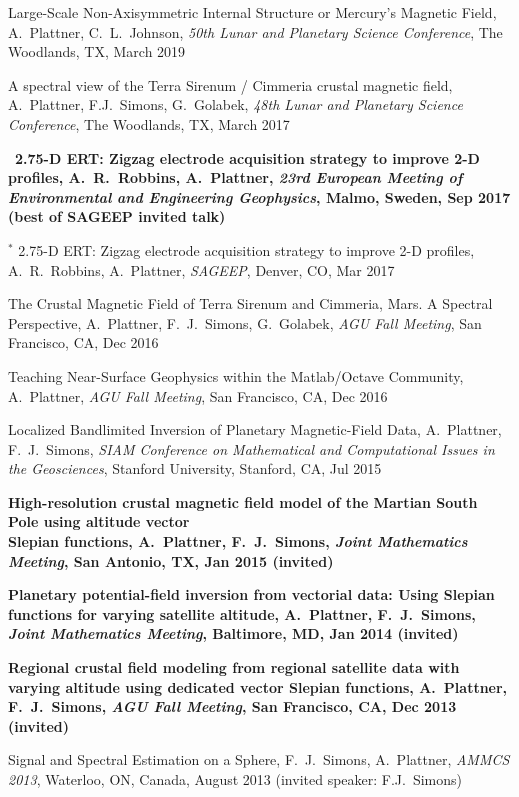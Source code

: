 \documentclass[10pt]{article}
\begin{document}
\spcp
Large-Scale Non-Axisymmetric Internal Structure or Mercury's Magnetic Field,
A.~Plattner, C.~L.~Johnson, \emph{50th Lunar and Planetary Science Conference},
The Woodlands, TX, March 2019

\spcp
A spectral view of the Terra Sirenum / Cimmeria crustal magnetic field, A.~Plattner, F.J.~Simons, G.~Golabek, \emph{48th Lunar and Planetary Science Conference}, The Woodlands, TX, March 2017

\spcp 
\hspace{-0.4cm}\ug \, \textbf{2.75-D ERT: Zigzag electrode acquisition strategy
to improve 2-D profiles,
A.~R.~Robbins, A.~Plattner,
\emph{23rd European Meeting of Environmental and Engineering Geophysics}, Malmo, Sweden, Sep 2017 (best of SAGEEP invited talk)}

\spcp 
\hspace{-0.4cm} $^*$ 2.75-D ERT: Zigzag electrode acquisition strategy
to improve 2-D profiles,
A.~R.~Robbins, A.~Plattner,
\emph{SAGEEP}, Denver, CO, Mar 2017

\spcp
The Crustal Magnetic Field of Terra Sirenum and Cimmeria, Mars. A Spectral Perspective,
A.~Plattner, F.~J.~Simons, G.~Golabek, 
\emph{AGU Fall Meeting}, San Francisco, CA, Dec 2016

\spcp
Teaching Near-Surface Geophysics within the Matlab/Octave Community,
A.~Plattner, 
\emph{AGU Fall Meeting}, San Francisco, CA, Dec 2016

\spcp
Localized Bandlimited Inversion of Planetary Magnetic-Field Data,
A.~Plattner, F.~J.~Simons,
\emph{SIAM Conference on Mathematical and Computational Issues in the Geosciences},
Stanford University, Stanford, CA, Jul 2015


\spcp
\textbf{High-resolution crustal magnetic field model of the Martian South Pole using altitude vector\\ Slepian functions,
A.~Plattner, F.~J.~Simons,
\emph{Joint Mathematics Meeting}, San Antonio, TX, Jan 2015 (invited)}

\spcp
\textbf{Planetary potential-field inversion from vectorial data: Using Slepian functions for varying satellite altitude,
A.~Plattner, F.~J.~Simons,
\emph{Joint Mathematics Meeting}, Baltimore, MD, Jan 2014 (invited)}

\spcp
\textbf{Regional crustal field modeling from regional satellite data with varying altitude using dedicated vector Slepian functions,
A.~Plattner, F.~J.~Simons,
\emph{AGU Fall Meeting}, San Francisco, CA, Dec 2013 (invited)}

\spcp
Signal and Spectral Estimation on a Sphere,
F.~J.~Simons, A.~Plattner,
\emph{AMMCS 2013}, Waterloo, ON, Canada, August 2013 (invited speaker: F.J.~Simons)
\end{document}
